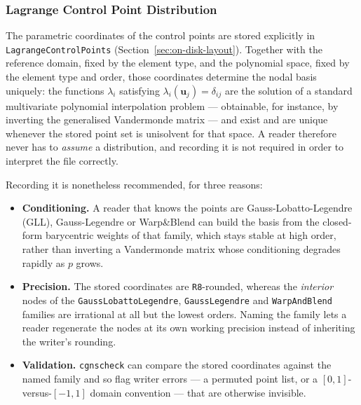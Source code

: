 \documentclass[11pt,letterpaper]{article}
\begin{document}
\subsubsection{Lagrange Control Point Distribution}
\label{sec:lagrange-distribution}

The parametric coordinates of the control points are stored explicitly in
\texttt{LagrangeControlPoints} (Section~\ref{sec:on-disk-layout}).  Together with the
reference domain, fixed by the element type, and the polynomial space, fixed by the element
type and order, those coordinates determine the nodal basis uniquely: the functions
$\lambda_i$ satisfying $\lambda_i(\mathbf{u}_j) = \delta_{ij}$ are the solution of a
standard multivariate polynomial interpolation problem --- obtainable, for instance, by
inverting the generalised Vandermonde matrix --- and exist and are unique whenever the
stored point set is unisolvent for that space.  A reader therefore never has to
\emph{assume} a distribution, and recording it is not required in order to interpret the
file correctly.

Recording it is nonetheless recommended, for three reasons:

\begin{itemize}
  \item \textbf{Conditioning.} A reader that knows the points are Gauss-Lobatto-Legendre
    (GLL), Gauss-Legendre or Warp\&Blend can build the basis from the closed-form
    barycentric weights of that family, which stays stable at high order, rather than
    inverting a Vandermonde matrix whose conditioning degrades rapidly as $p$ grows.
  \item \textbf{Precision.} The stored coordinates are \texttt{R8}-rounded, whereas the
    \emph{interior} nodes of the \texttt{GaussLobattoLegendre}, \texttt{GaussLegendre} and
    \texttt{WarpAndBlend} families are irrational at all but the lowest orders.  Naming the
    family lets a reader regenerate the nodes at its own working precision instead of
    inheriting the writer's rounding.
  \item \textbf{Validation.} \texttt{cgnscheck} can compare the stored coordinates against
    the named family and so flag writer errors --- a permuted point list, or a
    $[0,1]$-versus-$[-1,1]$ domain convention --- that are otherwise invisible.
\end{itemize}
\end{document}
